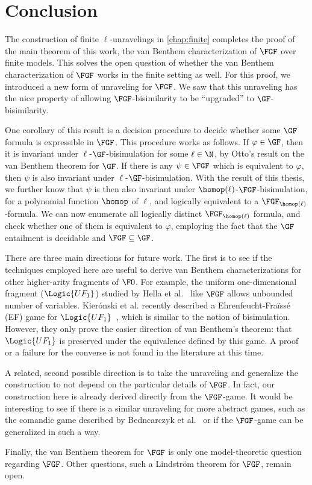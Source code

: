 \chapter{Conclusion}\label{chap:conclusion}
The construction of finite $\ell$-unravelings in \cref{chap:finite} completes the proof of the main theorem of this work, the van Benthem characterization of $\FGF$ over finite models.
This solves the open question of whether the van Benthem characterization of $\FGF$ works in the finite setting as well.
For this proof, we introduced a new form of unraveling for $\FGF$.
We saw that this unraveling has the nice property of allowing $\FGF$-bisimilarity to be ``upgraded'' to $\GF$-bisimilarity.

One corollary of this result is a decision procedure to decide whether some $\GF$ formula is expressible in $\FGF$.
This procedure works as follows.
If $\varphi \in \GF$, then it is invariant under $\ell$-$\GF$-bisimulation for some $\ell \in \N$, by Otto's result on the van Benthem theorem for $\GF$.
If there is any $\psi \in \FGF$ which is equivalent to $\varphi$, then $\psi$ is also invariant under $\ell$-$\GF$-bisimulation.
With the result of this thesis, we further know that $\psi$ is then also invariant under $\homop(\ell)$-$\FGF$-bisimulation, for a polynomial function $\homop$ of $\ell$, and logically equivalent to a $\FGF_{\homop(\ell)}$-formula.
We can now enumerate all logically distinct $\FGF_{\homop(\ell)}$ formula, and check whether one of them is equivalent to $\varphi$, employing the fact that the $\GF$ entailment is decidable and $\FGF \subseteq \GF$.

There are three main directions for future work.
The first is to see if the techniques employed here are useful to derive van Benthem characterizations for other higher-arity fragments of $\FO$.
For example, the uniform one-dimensional fragment ($\Logic{UF_{1}}$) studied by Hella et al.~\cite{hella2014} like $\FGF$ allows unbounded number of variables.
Kierónski et al. recently described a Ehrenfeucht-Fraïssé (EF) game for $\Logic{UF_{1}}$~\cite{kieronski2015}, which is similar to the notion of bisimulation.
However, they only prove the easier direction of van Benthem's theorem: that $\Logic{UF_{1}}$  is preserved under the equivalence defined by this game.
A proof or a failure for the converse is not found in the literature at this time.

A related, second possible direction is to take the unraveling and generalize the construction to not depend on the particular details of $\FGF$.
In fact, our construction here is already derived directly from the $\FGF$-game.
It would be interesting to see if there is a similar unraveling for more abstract games, such as the comandic game described by Bedncarczyk et al.~\cite{bednarczyk2022a} or if the $\FGF$-game can be generalized in such a way.

Finally, the van Benthem theorem for $\FGF$ is only one model-theoretic question regarding $\FGF$.
Other questions, such a Lindström theorem for $\FGF$, remain open.
